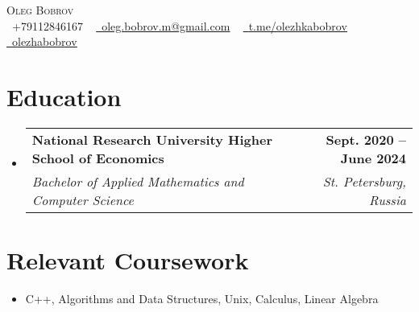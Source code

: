\documentclass[letterpaper,11pt]{article}
\makeatletter
\newcommand{\resumeSubheading}[4]{
  \vspace{-2pt}\item
    \begin{tabular*}{1.0\textwidth}[t]{l@{\extracolsep{\fill}}r}
      \textbf{#1} & \textbf{\large #2} \\
      \textit{\large#3} & \textit{\large #4} \\
    \end{tabular*}\vspace{-7pt}
}
\newcommand{\resumeSubHeadingListStart}{\begin{itemize}[leftmargin=0.0in, label={}]}
\newcommand{\resumeSubHeadingListEnd}{\end{itemize}}
\makeatother
\begin{document}

\begin{center}
    {\Huge \scshape Oleg Bobrov} \\ \vspace{1pt}
    \small \raisebox{-0.1\height}\faPhone\ +79112846167 ~ \href{mailto:oleg.bobrov.m@gmail.com}{\raisebox{-0.2\height}\faEnvelope\  \underline{oleg.bobrov.m@gmail.com}} ~ 
    \href{https://t.me/olezhkabobrov//}{\raisebox{-0.2\height}\faTelegram\ \underline{t.me/olezhkabobrov}}  ~
    \href{https://github.com/olezhabobrov}{\raisebox{-0.2\height}\faGithub\ \underline{olezhabobrov}}
    \vspace{-8pt}
\end{center}


\section{Education}
  \resumeSubHeadingListStart
    \resumeSubheading
      {National Research University Higher School of Economics}{Sept. 2020 -- June 2024 }
      {Bachelor of Applied Mathematics and Computer Science}{St. Petersburg, Russia}
  \resumeSubHeadingListEnd

\section{Relevant Coursework}
            \begin{itemize}[]
                \item\large C++, Algorithms and Data Structures,  Unix,  Calculus, Linear Algebra
 
            \end{itemize}
\end{document}
